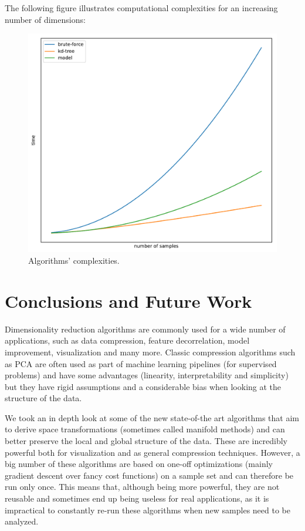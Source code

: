 \documentclass[a4paper,11pt,spanish]{report}
\begin{document}
The following figure illustrates computational complexities for an increasing number of dimensions:

\begin{figure}[h]
\centering
\includegraphics[width=12cm]{figures/complexities.pdf}
\caption{\label{figurecomplexities}Algorithms' complexities.}
\end{figure}






\chapter{Conclusions and Future Work}
\label{chap:conc}

Dimensionality reduction algorithms are commonly used for a wide number of applications, such as data compression, feature decorrelation, model improvement, visualization and many more. Classic compression algorithms such as PCA are often used as part of machine learning pipelines (for supervised problems) and have some advantages (linearity, interpretability and simplicity) but they have rigid assumptions and a considerable bias when looking at the structure of the data. 

We took an in depth look at some of the new state-of-the art algorithms that aim to derive space transformations (sometimes called manifold methods) and can better preserve the local and global structure of the data. These are incredibly powerful both for visualization and as general compression techniques. However, a big number of these algorithms are based on one-off optimizations (mainly gradient descent over fancy cost functions) on a sample set and can therefore be run only once. This means that, although being more powerful, they are not reusable and sometimes end up being useless for real applications, as it is impractical to constantly re-run these algorithms when new samples need to be analyzed.
\end{document}
